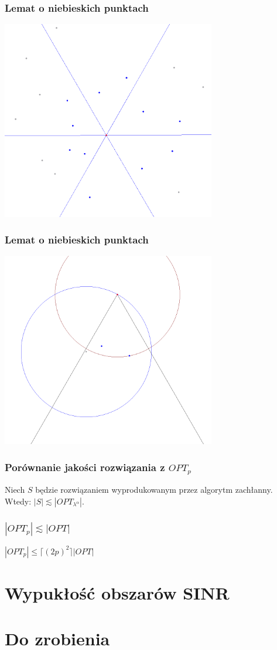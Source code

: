 \documentclass[polish, t,10pt]{beamer}
\begin{document}
\begin{frame}
    \frametitle{Lemat o niebieskich punktach}
    \centering
    \includegraphics[width=0.7\textwidth]{pictures/blue-dominant-1.png}
\end{frame}

\begin{frame}
    \frametitle{Lemat o niebieskich punktach}
    \centering
    \includegraphics[width=0.7\textwidth]{pictures/blue-dominant-2.png}
\end{frame}

\begin{frame}
    \frametitle{Porównanie jakości rozwiązania z $OPT_p$}
    \begin{lemma}
        Niech $S$ będzie rozwiązaniem wyprodukowanym przez algorytm zachłanny. Wtedy:
        $|S| \lesssim |OPT_{\lambda^{\alpha}}|$.
    \end{lemma}
\end{frame}

\begin{frame}
    \frametitle{$|OPT_p| \lesssim |OPT|$}
    \begin{lemma}
        $|OPT_p| \le \lceil (2p)^2 \rceil |OPT|$
    \end{lemma}
\end{frame}

\section{Wypukłość obszarów SINR}
\section{Do zrobienia}
\end{document}
